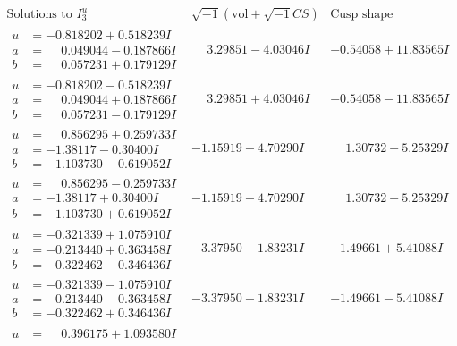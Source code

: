 \documentclass[1p]{elsarticle_modified}
\theoremstyle{definition}
\newcommand{\I}{\sqrt{-1}}
\begin{document}
$$\begin{array}{c|c|c}  
\text{Solutions to }I^u_{3}& \I (\text{vol} + \sqrt{-1}CS) & \text{Cusp shape}\\
 \hline 
\begin{aligned}
u &= -0.818202 + 0.518239 I \\
a &= \phantom{-}0.049044 - 0.187866 I \\
b &= \phantom{-}0.057231 + 0.179129 I\end{aligned}
 & \phantom{-}3.29851 - 4.03046 I & -0.54058 + 11.83565 I \\ \hline\begin{aligned}
u &= -0.818202 - 0.518239 I \\
a &= \phantom{-}0.049044 + 0.187866 I \\
b &= \phantom{-}0.057231 - 0.179129 I\end{aligned}
 & \phantom{-}3.29851 + 4.03046 I & -0.54058 - 11.83565 I \\ \hline\begin{aligned}
u &= \phantom{-}0.856295 + 0.259733 I \\
a &= -1.38117 - 0.30400 I \\
b &= -1.103730 - 0.619052 I\end{aligned}
 & -1.15919 - 4.70290 I & \phantom{-}1.30732 + 5.25329 I \\ \hline\begin{aligned}
u &= \phantom{-}0.856295 - 0.259733 I \\
a &= -1.38117 + 0.30400 I \\
b &= -1.103730 + 0.619052 I\end{aligned}
 & -1.15919 + 4.70290 I & \phantom{-}1.30732 - 5.25329 I \\ \hline\begin{aligned}
u &= -0.321339 + 1.075910 I \\
a &= -0.213440 + 0.363458 I \\
b &= -0.322462 - 0.346436 I\end{aligned}
 & -3.37950 - 1.83231 I & -1.49661 + 5.41088 I \\ \hline\begin{aligned}
u &= -0.321339 - 1.075910 I \\
a &= -0.213440 - 0.363458 I \\
b &= -0.322462 + 0.346436 I\end{aligned}
 & -3.37950 + 1.83231 I & -1.49661 - 5.41088 I \\ \hline\begin{aligned}
u &= \phantom{-}0.396175 + 1.093580 I \\

\end{aligned}
\end{array}$$
\end{document}
